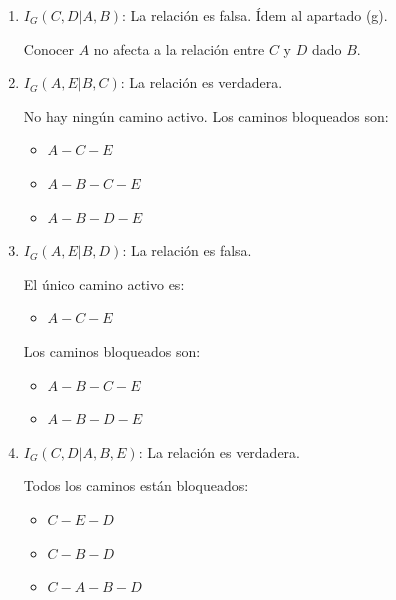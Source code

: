 \documentclass[12pt,a4paper]{article}
\begin{document}
\begin{enumerate}
    \item $I_G(C, D | A, B)$: \; La relación es falsa. Ídem al apartado (g). 
    
    Conocer $A$ no afecta a la relación entre $C$ y $D$ dado $B$.

    \item $I_G(A, E | B, C)$: \; La relación es verdadera.
    
    No hay ningún camino activo.
    Los caminos bloqueados son:
    \begin{multicols}{2}
        \begin{itemize}
            \item $A-C-E$
            \item $A-B-C-E$
            \item $A-B-D-E$
        \end{itemize}
    \end{multicols}

    \item $I_G(A, E | B, D)$: \; La relación es falsa.
    
    El único camino activo es:
    \begin{multicols}{2}
        \begin{itemize}
            \item $A-C-E$
        \end{itemize}
    \end{multicols}
    Los caminos bloqueados son:
    \begin{multicols}{2}
        \begin{itemize}
            \item $A-B-C-E$
            \item $A-B-D-E$
        \end{itemize}
    \end{multicols}
    
    \item $I_G(C, D | A, B, E)$: \; La relación es verdadera. 
    
    Todos los caminos están bloqueados:
    \begin{multicols}{2}
        \begin{itemize}
            \item $C-E-D$
            \item $C-B-D$
            \item $C-A-B-D$
        \end{itemize}
    \end{multicols}
\end{enumerate}
\end{document}
